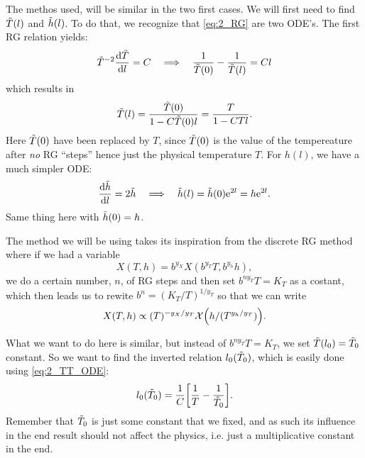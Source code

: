 \documentclass[11pt,letter, swedish, english
]{article}
\begin{document}
The methos used, will be similar in the two first cases. We will first
need to find $\tilde{T}(l)$ and $\tilde{h}(l)$.\footnotemark{} To do that, we
recognize that \eqref{eq:2_RG} are two ODE's. The first RG relation
yields:
\begin{equation}\label{eq:2_TT_ODE}
\tilde{T}^{-2}\dv{\tilde{T}}{l} = C
\quad\Longrightarrow\quad
\frac{1}{\tilde{T}(0)}-\frac{1}{\tilde{T}(l)} = Cl
\end{equation}
which results in
\begin{equation}\label{eq:2_TT(l)}
\tilde{T}(l) = \frac{\tilde{T}(0)}{1-C\tilde{T}(0)l} = \frac{T}{1-CTl}.
\end{equation}
Here $\tilde{T}(0)$ have been replaced by $T$, since $\tilde{T}(0)$ is the value
of the tempereature after \emph{no} RG ``steps'' hence just the
physical temperature $T$. For $h(l)$, we have a much simpler ODE:
\begin{equation}\label{eq:2_hT(l)}
\dv{\tilde{h}}{l} = 2\tilde{h}
\quad\Longrightarrow\quad
\tilde{h}(l) = \tilde{h}(0)\mathrm{e}^{2l} = h\mathrm{e}^{2l}.
\end{equation}
Same thing here with $\tilde{h}(0)=h$.


The method we will be using takes its inspiration from the discrete
RG method where if we had a variable
\begin{equation}
X(T,h) = b^{y_X}X(b^{y_T}T, b^{y_h}h),
\end{equation}
we do a certain number, $n$, of RG steps and then set $b^{ny_T}T=K_T$
as a costant, which then leads us to rewite $b^n = (K_T/T)^{1/y_T}$ so
that we can write
\begin{equation}
X(T,h) \propto (T)^{-y_X/y_T}\mathcal{X}\qty(h/(T^{y_h/y_T})).
\end{equation}

What we want to do here is similar, but instead of $b^{ny_T}T=K_T$, we
set $\tilde{T}(l_0) = \tilde{T}_0$ constant. So we want to find the inverted
relation $l_0(\tilde{T}_0)$, which is easily done using \eqref{eq:2_TT_ODE}:
\begin{equation}\label{eq:2_l(TT)}
l_0(\tilde{T}_0) = \frac{1}{C}\qty[\frac{1}{T}-\frac{1}{\tilde{T}_0}].
\end{equation}
Remember that $\tilde{T}_0$ is just some constant that we fixed, and as such
its influence in the end result should not affect the physics,
i.e. just a multiplicative constant in the end. 
\end{document}
